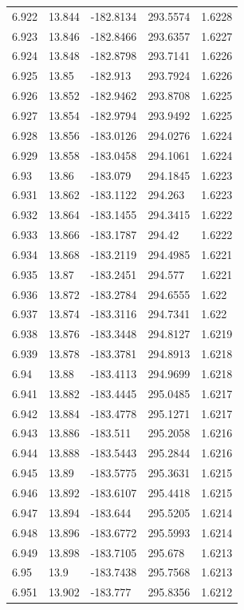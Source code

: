 \begin{tabular}{lllll}
6.922 & 13.844 & -182.8134 & 293.5574 & 1.6228 \\
6.923 & 13.846 & -182.8466 & 293.6357 & 1.6227 \\
6.924 & 13.848 & -182.8798 & 293.7141 & 1.6226 \\
6.925 & 13.85 & -182.913 & 293.7924 & 1.6226 \\
6.926 & 13.852 & -182.9462 & 293.8708 & 1.6225 \\
6.927 & 13.854 & -182.9794 & 293.9492 & 1.6225 \\
6.928 & 13.856 & -183.0126 & 294.0276 & 1.6224 \\
6.929 & 13.858 & -183.0458 & 294.1061 & 1.6224 \\
6.93 & 13.86 & -183.079 & 294.1845 & 1.6223 \\
6.931 & 13.862 & -183.1122 & 294.263 & 1.6223 \\
6.932 & 13.864 & -183.1455 & 294.3415 & 1.6222 \\
6.933 & 13.866 & -183.1787 & 294.42 & 1.6222 \\
6.934 & 13.868 & -183.2119 & 294.4985 & 1.6221 \\
6.935 & 13.87 & -183.2451 & 294.577 & 1.6221 \\
6.936 & 13.872 & -183.2784 & 294.6555 & 1.622 \\
6.937 & 13.874 & -183.3116 & 294.7341 & 1.622 \\
6.938 & 13.876 & -183.3448 & 294.8127 & 1.6219 \\
6.939 & 13.878 & -183.3781 & 294.8913 & 1.6218 \\
6.94 & 13.88 & -183.4113 & 294.9699 & 1.6218 \\
6.941 & 13.882 & -183.4445 & 295.0485 & 1.6217 \\
6.942 & 13.884 & -183.4778 & 295.1271 & 1.6217 \\
6.943 & 13.886 & -183.511 & 295.2058 & 1.6216 \\
6.944 & 13.888 & -183.5443 & 295.2844 & 1.6216 \\
6.945 & 13.89 & -183.5775 & 295.3631 & 1.6215 \\
6.946 & 13.892 & -183.6107 & 295.4418 & 1.6215 \\
6.947 & 13.894 & -183.644 & 295.5205 & 1.6214 \\
6.948 & 13.896 & -183.6772 & 295.5993 & 1.6214 \\
6.949 & 13.898 & -183.7105 & 295.678 & 1.6213 \\
6.95 & 13.9 & -183.7438 & 295.7568 & 1.6213 \\
6.951 & 13.902 & -183.777 & 295.8356 & 1.6212 \\

\end{tabular}
